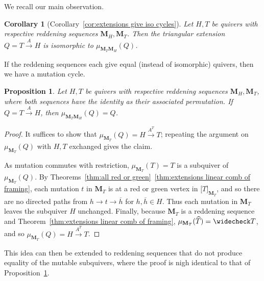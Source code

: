 \documentclass[11pt, letterpaper]{amsart}
\newtheorem{proposition}[theorem]{Proposition}
\newtheorem{corollary}[theorem]{Corollary}
\theoremstyle{definition}
\numberwithin{equation}{section}
\begin{document}
We recall our main observation.

\begin{corollary}[{Corollary~\ref{cor:extensions give iso cycles}}]
Let $H,T$ be quivers with respective reddening sequences $\mathbf{M}_H, \mathbf{M}_T$.
Then the triangular extension $Q = T \stackrel{A}\rightarrow H$ is isomorphic to $\mu_{\mathbf{M}_T\mathbf{M}_H}(Q)$.
\end{corollary}

If the reddening sequences each give equal (instead of isomorphic) quivers, then we have a mutation cycle.

\begin{proposition}
\label{prop:extensions with equality give cycles}
    Let $H,T$ be quivers with respective reddening sequences $\mathbf{M}_H, \mathbf{M}_T$, where both sequences have the identity as their associated permutation. 
    If $Q = T \stackrel{A}{\rightarrow} H$, then $\mu_{\mathbf{M}_T\mathbf{M}_H}(Q) = Q$.
\end{proposition}

\begin{proof}
It suffices to show that $\mu_{\mathbf{M}_T}(Q) = H \stackrel{A^T}{\rightarrow} T$; repeating the argument on $\mu_{\mathbf{M}_T}(Q)$ with $H,T$ exchanged gives the claim.

As mutation commutes with restriction, $\mu_{\mathbf{M}_T}(T) = T$ is a subquiver of $\mu_{\mathbf{M}_T}(Q)$. 
By Theorems~\ref{thm:all red or green}~\ref{thm:extensions linear comb of framing}, each mutation $t$ in $\mathbf{M}_T$ is at a red or green vertex in $\big [ T \big ]_{\mathbf M_T}$, and so there are no directed paths from $h \rightarrow t \rightarrow \overline h$ for $h, \overline h \in H$.
Thus each mutation in $\mathbf{M}_T$ leaves the subquiver $H$ unchanged.
Finally, because $\mathbf{M}_T$ is a reddening sequence and Theorem~\ref{thm:extensions linear comb of framing}, $\mu_{\mathbf{M}_T}(\widehat T) = \widecheck T$, and so $\mu_{\mathbf{M}_T}(Q) = H \stackrel{A^T}{\rightarrow} T$.
\end{proof}



This idea can then be extended to reddening sequences that do not produce equality of the mutable subquivers, where the proof is nigh identical to that of Proposition~\ref{prop:extensions with equality give cycles}.
\end{document}
